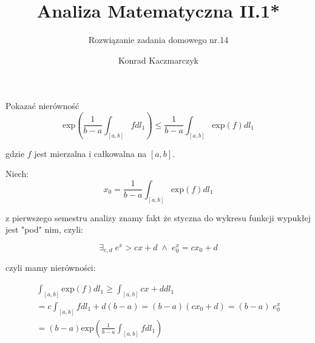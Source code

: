 \documentclass[11pt]{scrartcl}
\author{Konrad Kaczmarczyk}
\begin{document}
  \title{Analiza Matematyczna II.1*}
  \subtitle{Rozwiązanie zadania domowego nr.14}
  \maketitle
    \begin{zadanie*}
        Pokazać nierówność
        \[
          \text{exp} \left ( \frac{1}{b - a} \int_{[a,b]} f dl_1  \right ) \leq \frac{1}{b - a} \int_{[a,b]} \text{exp} (f) dl_1
        \]

        gdzie $f$ jest mierzalna i całkowalna na $[a,b]$.
        
    \end{zadanie*}

    Niech:
    \[
      x_0 = \frac{1}{b - a} \int_{[a,b]} \text{exp} (f) dl_1
    \]

    z pierwszego semestru analizy znamy fakt że styczna do wykresu funkcji wypukłej jest "pod" nim, czyli:

    \[
      \exists_{c, d} \; e^x > cx + d \; \wedge \; e^x_0 = cx_0 + d
    \]

    czyli mamy nierówności:

    \begin{gather*}
      \int_{[a, b]} \text{exp} (f) dl_1 \geq \int_{[a,b]} cx + d dl_1 \\
      = c \int_{[a,b]} f dl_1 + d (b - a) = (b - a)(cx_0 + d) = (b - a) \; e^x_0 \\
      = (b - a) \text{exp} ( \frac{1}{b - a} \int_{[a,b]} f dl_1 )
    \end{gather*}

    
\end{document}
